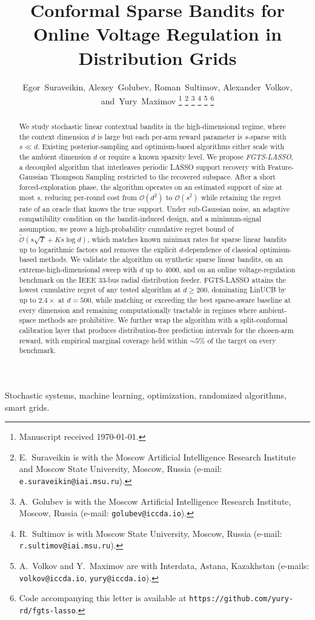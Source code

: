 \documentclass[10pt,journal,twoside,twocolumn]{IEEEtran}
\title{Conformal Sparse Bandits for Online Voltage Regulation in Distribution Grids}
\author{Egor~Suraveikin,
        Alexey~Golubev,
        Roman~Sultimov,
        Alexander~Volkov,
        and~Yury~Maximov%
\thanks{Manuscript received \today.}%
\thanks{E.~Suraveikin is with the Moscow Artificial Intelligence Research Institute and Moscow State University, Moscow, Russia (e-mail: \texttt{e.suraveikin@iai.msu.ru}).}%
\thanks{A.~Golubev is with the Moscow Artificial Intelligence Research Institute, Moscow, Russia (e-mail: \texttt{golubev@iccda.io}).}%
\thanks{R.~Sultimov is with Moscow State University, Moscow, Russia (e-mail: \texttt{r.sultimov@iai.msu.ru}).}%
\thanks{A.~Volkov and Y.~Maximov are with Interdata, Astana, Kazakhstan (e-mails: \texttt{volkov@iccda.io}, \texttt{yury@iccda.io}).}%
\thanks{Code accompanying this letter is available at \texttt{https://github.com/yury-rd/fgts-lasso}.}%
}
\begin{document}
\maketitle

\begin{abstract}
We study stochastic linear contextual bandits in the high-dimensional regime, where the context dimension $d$ is large but each per-arm reward parameter is $s$-sparse with $s \ll d$. Existing posterior-sampling and optimism-based algorithms either scale with the ambient dimension $d$ or require a known sparsity level. We propose \emph{FGTS-LASSO}, a decoupled algorithm that interleaves periodic LASSO support recovery with Feature-Gaussian Thompson Sampling restricted to the recovered subspace. After a short forced-exploration phase, the algorithm operates on an estimated support of size at most $s$, reducing per-round cost from $\mathcal{O}(d^2)$ to $\mathcal{O}(s^2)$ while retaining the regret rate of an oracle that knows the true support. Under sub-Gaussian noise, an adaptive compatibility condition on the bandit-induced design, and a minimum-signal assumption, we prove a high-probability cumulative regret bound of $\tilde{\mathcal{O}}(s\sqrt{T} + Ks\log d)$, which matches known minimax rates for sparse linear bandits up to logarithmic factors and removes the explicit $d$-dependence of classical optimism-based methods. We validate the algorithm on synthetic sparse linear bandits, on an extreme-high-dimensional sweep with $d$ up to $4000$, and on an online voltage-regulation benchmark on the IEEE 33-bus radial distribution feeder. FGTS-LASSO attains the lowest cumulative regret of any tested algorithm at $d \geq 200$, dominating LinUCB by up to $2.4\times$ at $d = 500$, while matching or exceeding the best sparse-aware baseline at every dimension and remaining computationally tractable in regimes where ambient-space methods are prohibitive. We further wrap the algorithm with a split-conformal calibration layer that produces distribution-free prediction intervals for the chosen-arm reward, with empirical marginal coverage held within $\sim$$5\%$ of the target on every benchmark.
\end{abstract}

\begin{IEEEkeywords}
Stochastic systems, machine learning, optimization, randomized algorithms, smart grids.
\end{IEEEkeywords}
\end{document}
